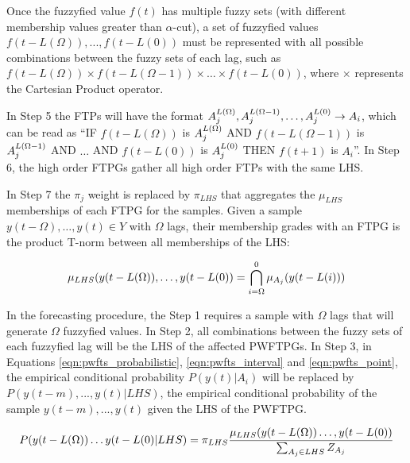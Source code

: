 Once the fuzzyfied value $f(t)$ has multiple fuzzy sets (with different membership values greater than $\alpha$-cut), a set of fuzzyfied values $f(t-L(\Omega)),...,f(t-L(0))$ must be represented with all possible combinations between the fuzzy sets of each lag, such as $f(t-L(\Omega)) \times f(t - L(\Omega-1)) \times \ldots \times f(t-L(0))$, where $\times$ represents the Cartesian Product operator. 

In Step 5 the FTPs will have the format $A_j^{L(\Omega)}, A_j^{L(\Omega-1)},\ldots,A_j^{L(0)} \rightarrow A_i$, which can be read as ``IF $f(t-L(\Omega))$ is $A_j^{L(\Omega)}$ AND $f(t-L(\Omega-1))$ is $A_j^{L(\Omega-1)}$ AND $\dots$ AND $f(t-L(0))$ is $A_j^{L(0)}$ THEN $f(t+1)$ is $A_i$''. In Step 6, the high order FTPGs gather all high order FTPs with the same LHS. 

In Step 7 the $\pi_j$ weight is replaced by $\pi_{LHS}$ that aggregates the $\mu_{LHS}$ memberships of each FTPG for the samples. Given a sample $y(t-\Omega),\dots,y(t) \in Y$ with $\Omega$ lags, their membership grades with an FTPG is the product T-norm between all memberships of the LHS: 

\begin{equation}
\displaystyle  \mu_{LHS}(y(t-L(\Omega)),\ldots,y(t-L(0)) = \bigcap_{i = \Omega}^0 \mu_{A_j}(y(t-L(i)))
\label{eqn:extension_highorder_mu}
\end{equation}

In the forecasting procedure, the Step 1 requires a sample with $\Omega$ lags that will generate $\Omega$ fuzzyfied values. In Step 2, all combinations between the fuzzy sets of each fuzzyfied lag will be the LHS of the affected PWFTPGs. In Step 3, in Equations \eqref{eqn:pwfts_probabilistic}, \eqref{eqn:pwfts_interval} and \eqref{eqn:pwfts_point}, the empirical conditional probability $P(y(t)|A_i)$ will be replaced by $P(y(t-m),...,y(t) | LHS)$, the empirical conditional probability of the sample $y(t-m),...,y(t)$ given the LHS of the PWFTPG.

\begin{equation}
\displaystyle P(y(t-L(\Omega))\ldots y(t-L(0) | LHS) = \pi_{LHS} \frac{\mu_{LHS}(y(t-L(\Omega))\ldots,y(t-L(0))}{\sum_{A_j \in LHS} Z_{A_j}}
\label{eqn:extension_highorder}
\end{equation}



